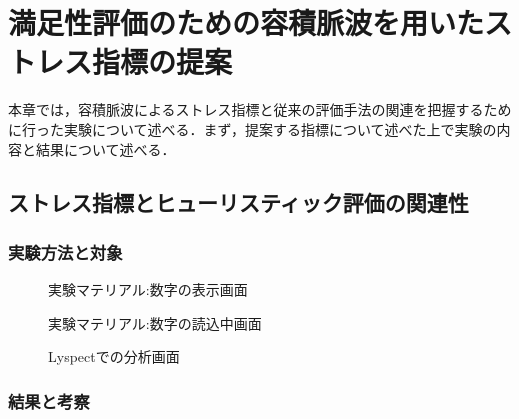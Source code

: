 \chapter{満足性評価のための容積脈波を用いたストレス指標の提案}
\label{chap:pulsewave}

本章では，容積脈波によるストレス指標と従来の評価手法の関連を把握するために行った実験について述べる．まず，提案する指標について述べた上で実験の内容と結果について述べる．


\section{ストレス指標とヒューリスティック評価の関連性}

\subsection{実験方法と対象}

\begin{figure}[htbp]
  \begin{minipage}{0.5\hsize}
    \begin{center}
    \end{center}
    \caption{実験マテリアル:数字の表示画面}
    \label{fig:lyspect}
  \end{minipage}
  \begin{minipage}{0.5\hsize}
    \begin{center}
    \end{center}
    \caption{実験マテリアル:数字の読込中画面}
    \label{fig:lyspect}
  \end{minipage}
\end{figure}

\begin{figure}[htbp]
  \begin{minipage}{\hsize}
    \begin{center}
    \end{center}
    \caption{Lyspectでの分析画面}
    \label{fig:lyspect}
  \end{minipage}
\end{figure}


\subsection{結果と考察}